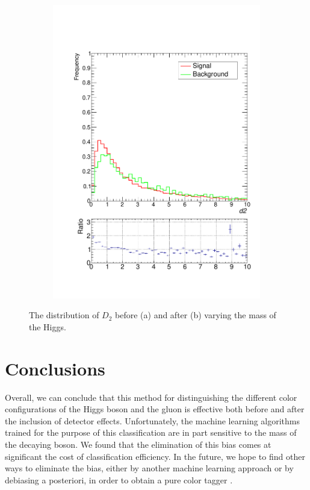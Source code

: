 \documentclass[10pt,a4paper]{book}
\begin{document}
\begin{figure}[h]
\begin{subfigure}{0.5\textwidth}
\includegraphics[scale=0.35]{ch4_images/d2_distribution_massbias}
\caption{}
\end{subfigure}
\caption{The distribution of $D_2$ before (a) and after (b) varying the mass of the Higgs.}
\label{d2 mass bias}
\end{figure}


\section{Conclusions}

Overall, we can conclude that this method for distinguishing the different color configurations of the Higgs boson and the gluon is effective both before and after the inclusion of detector effects. Unfortunately, the machine learning algorithms trained for the purpose of this classification are in part sensitive to the mass of the decaying boson. We found that the elimination of this bias comes at significant the cost of classification efficiency. In the future, we hope to find other ways to eliminate the bias, either by another machine learning approach or by debiasing a posteriori, in order to obtain a pure color tagger \cite{Dolen:2016kst, Moult:2017okx}.
\end{document}
